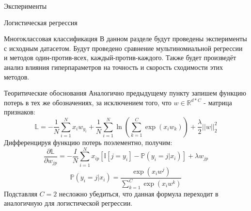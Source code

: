 \documentclass[a4paper,12pt,titlepage,finall]{article}
\begin{document}
\begin{section}{Эксперименты}
\begin{subsection}{Логистическая регрессия}
\end{subsection}

\begin{subsection}{Многоклассовая классификация}
		В данном разделе будут проведены эксперименты с исходным датасетом. Будут проведено сравнение мультиномиальной регрессии и методов один-против-всех, каждый-против-каждого. Также будет произведёт анализ влияния гиперпараметров на точность и скорость сходимости этих методов.
	
\begin{subsubsection}{Теоритические обоснования}
		Аналогично предыдущему пункту запишем функцию потерь в тех же обозначениях, за исключением того, что $w \in \mathbb{R}^{d*C}$ - матрица признаков:
		$$ \mathbb{L} = -\frac{1}{N} \sum_{i=1}^{N} x_{i}w_{y_{i}} + \frac{1}{N} \sum_{i=1}^{N} \ln(\sum_{k=1}^{C}\exp(x_{i}w_{k})) + \frac{\lambda}{2}||w||_{2}^{2} $$
		Дифференцируя функцию потерь поэлементно, получим:
		$$\frac{\partial\mathbb{L}}{\partial w_{jp}} = -\frac{I}{N}\sum_{i=1}^{N}x_{ip}[\mathbb{I}[j=y_{i}] - \mathbb{P}(y_{i}=j|x_{i})] + \lambda w_{jp}$$
		$$
		\mathbb{P}(y_{i}=j|x_{i}) = \frac{ \exp(x_{i}w^{j}) } {\sum_{k=1}^{C} \exp(x_{i}w^{k})}
		$$
		Подставляя $C = 2$ несложно убедиться, что данная формула переходит в аналогичную для логистической регрессии.
\end{subsubsection}
	

\end{subsection}
\end{section}
\end{document}
